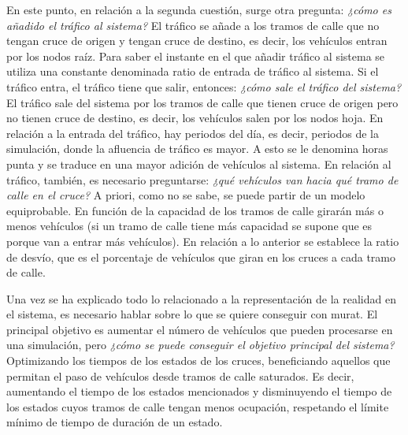 En este punto, en relación a la segunda cuestión, surge otra pregunta: \textit{¿cómo es añadido el tráfico al sistema?} El tráfico se añade a los tramos de calle que no tengan cruce de origen y tengan cruce de destino, es decir, los vehículos entran por los nodos raíz. Para saber el instante en el que añadir tráfico al sistema se utiliza una constante denominada ratio de entrada de tráfico al sistema. Si el tráfico entra, el tráfico tiene que salir, entonces: \textit{¿cómo sale el tráfico del sistema?} El tráfico sale del sistema por los tramos de calle que tienen cruce de origen pero no tienen cruce de destino, es decir, los vehículos salen por los nodos hoja. En relación a la entrada del tráfico, hay periodos del día, es decir, periodos de la simulación, donde la afluencia de tráfico es mayor. A esto se le denomina horas punta y se traduce en una mayor adición de vehículos al sistema.\newline
En relación al tráfico, también, es necesario preguntarse: \textit{¿qué vehículos van hacia qué tramo de calle en el cruce?} A priori, como no se sabe, se puede partir de un modelo equiprobable. En función de la capacidad de los tramos de calle girarán más o menos vehículos (si un tramo de calle tiene más capacidad se supone que es porque van a entrar más vehículos). En relación a lo anterior se establece la ratio de desvío, que es el porcentaje de vehículos que giran en los cruces a cada tramo de calle.

Una vez se ha explicado todo lo relacionado a la representación de la realidad en el sistema, es necesario hablar sobre lo que se quiere conseguir con \acrshort{murat}. El principal objetivo es aumentar el número de vehículos que pueden procesarse en una simulación, pero \textit{¿cómo se puede conseguir el objetivo principal del sistema?} Optimizando los tiempos de los estados de los cruces, beneficiando aquellos que permitan el paso de vehículos desde tramos de calle saturados. Es decir, aumentando el tiempo de los estados mencionados y disminuyendo el tiempo de los estados cuyos tramos de calle tengan menos ocupación, respetando el límite mínimo de tiempo de duración de un estado.

\newpage
